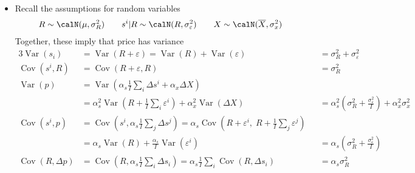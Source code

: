 \documentclass[12pt]{article}
\theoremstyle{plain}
\theoremstyle{definition}
\theoremstyle{remark}
\newcommand{\Cov}{\operatorname{Cov}}
\newcommand{\Var}{\operatorname{Var}}
\begin{document}
\begin{itemize}
  \item
    Recall the assumptions for random variables
    \begin{align*}
      R\sim\calN(\mu,\sigma^2_R)
      \qquad
      s^i|R \sim\calN(R,\sigma^2_\varepsilon)
      \qquad
      X\sim\calN(\overline{X},\sigma^2_x)
    \end{align*}
    Together, these imply that price has variance
    \begin{alignat*}{3}
      \Var(s_i)
      &=\Var(R+\varepsilon)
      = \Var(R)+\Var(\varepsilon)
      &&=\sigma^2_R+\sigma^2_\varepsilon
      \\
      \Cov(s^i,R)
      &=
      \Cov(R+\varepsilon,R)
      &&= \sigma^2_R
      \\
      \Var(p)
      &=
      \Var\left(
        \alpha_s\frac{1}{I}\sum_i\Delta s^i
        +\alpha_x\Delta X
      \right)
      \\
      &=
      \alpha_s^2
      \Var\left(
        R
        +\frac{1}{I}
        \sum_i
        \varepsilon^i
      \right)
      +\alpha_x^2\Var\left(
        \Delta X
      \right)
      &&=
      \alpha_s^2 \left(
        \sigma^2_R+\frac{\sigma^2_\varepsilon}{I}
      \right)
      + \alpha_x^2 \sigma^2_x
      \\
      \Cov( s^i, p)
      &=
      \Cov\left(s^i,\alpha_s \frac{1}{I}\sum_j\Delta s^j\right)
      =
      \alpha_s
      \Cov\left(
        R+\varepsilon^i,\;
        R
        +
        \frac{1}{I}
        \sum_j \varepsilon^j
      \right)
      \\
      &
      =
      \alpha_s
      \Var(R)
      + \frac{\alpha_s}{I}\Var(\varepsilon^i)
      &&=
      \alpha_s\left(\sigma^2_R+\frac{\sigma^2_\varepsilon}{I}\right)
      \\
      \Cov(R,\Delta p)
      &=
      \Cov\left(R,\alpha_s\frac{1}{I}\sum_i \Delta s_i\right)
      = \alpha_s\frac{1}{I}\sum_i \Cov\left(R,\Delta s_i\right)
      &&= \alpha_s\sigma^2_R
    \end{alignat*}


\end{itemize}
\end{document}
